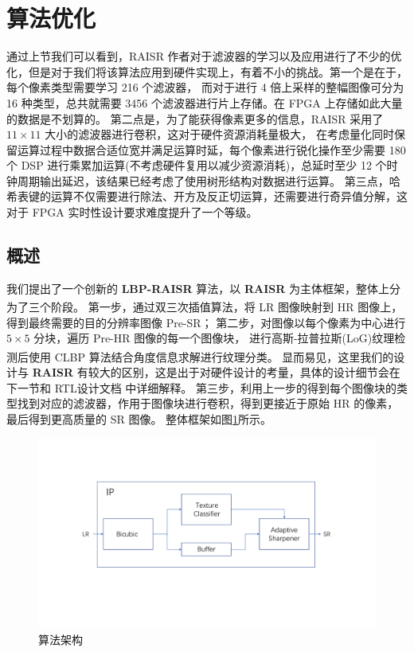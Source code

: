 \documentclass[12pt, a4paper, oneside]{ctexbook}
\begin{document}
	\section{算法优化}
	通过上节我们可以看到，RAISR 作者对于滤波器的学习以及应用进行了不少的优化，但是对于我们将该算法应用到硬件实现上，有着不小的挑战。第一个是在于，每个像素类型需要学习 216 个滤波器，
	而对于进行 4 倍上采样的整幅图像可分为 16 种类型，总共就需要 3456 个滤波器进行片上存储。在 FPGA 上存储如此大量的数据是不划算的。
	第二点是，为了能获得像素更多的信息，RAISR 采用了 $11\times11$ 大小的滤波器进行卷积，这对于硬件资源消耗量极大，
	在考虑量化同时保留运算过程中数据合适位宽并满足运算时延，每个像素进行锐化操作至少需要 180 个 DSP 进行乘累加运算(不考虑硬件复用以减少资源消耗)，总延时至少 12 个时钟周期输出延迟，该结果已经考虑了使用树形结构对数据进行运算。
	第三点，哈希表键的运算不仅需要进行除法、开方及反正切运算，还需要进行奇异值分解，这对于 FPGA 实时性设计要求难度提升了一个等级。
	\subsection{概述}
	我们提出了一个创新的 \textbf{LBP-RAISR} 算法，以 \textbf{RAISR} 为主体框架，整体上分为了三个阶段。
	第一步，通过双三次插值算法\textsuperscript{\cite{4}\cite{5}}，将 LR 图像映射到 HR 图像上，得到最终需要的目的分辨率图像 Pre-SR；
	第二步，对图像以每个像素为中心进行 $5\times5$ 分块，遍历 Pre-HR 图像的每一个图像块，
	进行高斯-拉普拉斯(LoG)纹理检测后使用 CLBP 算法\textsuperscript{\cite{8}\cite{9}}结合角度信息求解进行纹理分类。
	显而易见，这里我们的设计与 \textbf{RAISR} 有较大的区别，这是出于对硬件设计的考量，具体的设计细节会在下一节和 RTL设计文档 中详细解释。
	第三步，利用上一步的得到每个图像块的类型找到对应的滤波器，作用于图像块进行卷积，得到更接近于原始 HR 的像素，最后得到更高质量的 SR 图像。
	整体框架如图\ref{overview}所示。
	\begin{figure}[h]
		\centering
		\includegraphics[scale=0.65]{./pic/overview.pdf}
		\caption{算法架构}
		\label{overview}
	\end{figure}
\end{document}

